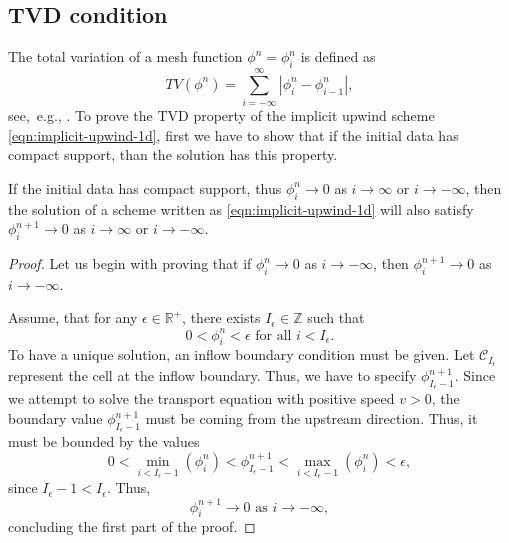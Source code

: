 \documentclass[../thesis.tex]{subfiles}
\begin{document}
\subsection{TVD condition}
The total variation of a mesh function \(\phi^{n} = {\phi_{i}^{n}}\) is defined
as
\begin{equation}
    TV(\phi^{n}) =
    \sum_{i = -\infty}^{\infty}|\phi_{i}^{n} - \phi_{i-1}^{n}|,
\end{equation}
see,~e.g., \cite{1977_VanLeer,1983_Harten,1984_Sweby,1985_Yee,1990_Hirsch_BOOK,1992_LeVeque_BOOK,1996_Jasak,1998_Laney_BOOK,2000_Hoffmann,2002_LeVeque_BOOK,2007_Hirsch_BOOK}.
To prove the TVD property of the implicit upwind scheme \eqref{eqn:implicit-upwind-1d},
first we have to show that if the initial data has compact support, than the solution has this property.
\begin{theorem}
    If the initial data has compact support, thus
    \(\phi_{i}^{n} \rightarrow 0 \) as \(i \rightarrow \infty\) or \(i \rightarrow -\infty\), then the solution of a scheme written as \eqref{eqn:implicit-upwind-1d} will also satisfy \(\phi_{i}^{n+1} \rightarrow 0 \) as \(i \rightarrow \infty\) or \(i \rightarrow -\infty\).
\begin{proof}
    Let us begin with proving that if \(\phi_{i}^{n} \rightarrow 0 \)  as \(i \rightarrow -\infty\), then \(\phi_{i}^{n+1} \rightarrow 0 \) as \(i \rightarrow -\infty\).

    Assume, that for any \(\epsilon \in \mathbb{R}^+\), there exists \(I_{\epsilon} \in \mathbb{Z}\) such that
    \begin{equation}\label{eqn:proof-compact-1}
        0 < \phi_{i}^{n} < \epsilon \text{ for all } i < I_{\epsilon}.
    \end{equation}
    To have a unique solution, an inflow boundary condition must be given.
    Let \(\mathcal{C}_{I_{\epsilon}}\) represent the cell at the inflow boundary.
    Thus, we have to specify \(\phi_{I_{\epsilon}-1}^{n+1}\).
    Since we attempt to solve the transport equation with positive speed \(v > 0\), the boundary value \(\phi_{I_{\epsilon}-1}^{n+1}\) must be coming from the upstream direction. Thus, it must be bounded by the values
    \[
        0 < \min_{i<I_{\epsilon}-1}(\phi_{i}^{n})
        < \phi_{I_{\epsilon}-1}^{n+1}
        < \max_{i<I_{\epsilon}-1}(\phi_{i}^{n})
        < \epsilon,
    \]
    since \(I_{\epsilon}-1 < I_{\epsilon}\).
    Thus,
    \[
        \phi_{i}^{n+1} \rightarrow 0 \text{ as } i \rightarrow -\infty,
    \]
    concluding the first part of the proof.


\end{proof}
\end{theorem}
\end{document}
